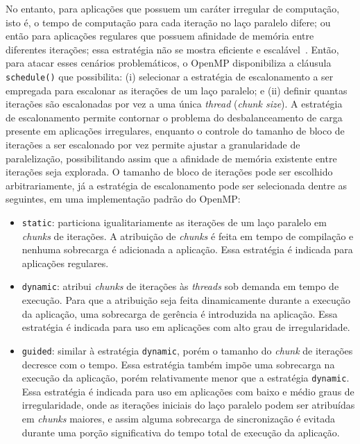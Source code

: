 \documentclass{SBCbookchapter}
\begin{document}
		
		No entanto, para aplicações que possuem um caráter irregular de
		computação, isto é, o tempo de computação para cada iteração no laço
		paralelo difere; ou então para aplicações regulares que possuem
		afinidade de memória entre diferentes iterações; essa estratégia não
		se mostra eficiente e escalável~\cite{Carino2008a}. Então, para atacar esses
		cenários problemáticos, o OpenMP disponibiliza a cláusula
		\texttt{schedule()} que possibilita: (i) selecionar a estratégia de
		escalonamento a ser empregada para escalonar as
		iterações de um laço paralelo; e (ii) definir quantas iterações são
		escalonadas por vez a uma única \textit{thread} (\textit{chunk size}).
		A estratégia de escalonamento permite contornar o problema do
		desbalanceamento de carga presente em aplicações irregulares,
		enquanto o controle do tamanho de bloco de iterações a ser escalonado
		por vez permite ajustar a granularidade de paralelização, possibilitando
		assim que a afinidade de memória existente entre iterações seja explorada.
		O tamanho de bloco de iterações pode ser escolhido arbitrariamente,
		já a estratégia de escalonamento pode ser selecionada dentre as
		seguintes, em uma implementação padrão do OpenMP:
		\begin{itemize}
			\item \texttt{static}: particiona igualitariamente as iterações de um
			laço paralelo em \textit{chunks} de iterações. A atribuição de \textit{chunks}
			é feita em tempo de compilação e nenhuma sobrecarga é
			adicionada a aplicação. Essa estratégia é indicada para
			aplicações regulares.
			
			\item \texttt{dynamic}: atribui \textit{chunks} de iterações às \textit{threads} sob
			demanda em tempo de execução. Para que a atribuição seja feita
			dinamicamente durante a execução da aplicação, uma sobrecarga de
			gerência é introduzida na aplicação. Essa estratégia é indicada
			para uso em aplicações com alto grau de irregularidade.

			\item \texttt{guided}: similar à estratégia \texttt{dynamic}, porém o tamanho do
			\textit{chunk} de iterações decresce com o tempo. Essa estratégia
			também impõe uma sobrecarga na execução da aplicação, porém
			relativamente menor que a estratégia \texttt{dynamic}. Essa
			estratégia é indicada para uso em aplicações com baixo e
			médio graus de irregularidade, onde as iterações iniciais
			do laço paralelo podem ser atribuídas em \textit{chunks} maiores, e
			assim alguma sobrecarga de sincronização é evitada durante uma porção
			significativa do tempo total de execução da aplicação.
		\end{itemize}
		
\end{document}
